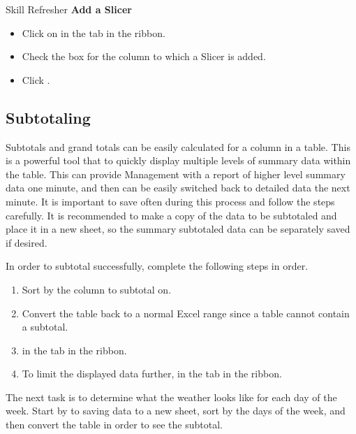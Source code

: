 \begin{center}
	\begin{sklbox}{Skill Refresher}
		\textbf{Add a Slicer}
		\\
		\begin{itemize}
			\setlength{\itemsep}{0pt}
			\setlength{\parskip}{0pt}
			\setlength{\parsep}{0pt}

			\item Click on  in the  tab in the ribbon.
			\item Check the box for the column to which a Slicer is added.
			\item Click .
			
		\end{itemize}
	\end{sklbox}
\end{center}

\subsection{Subtotaling}

Subtotals and grand totals can be easily calculated for a column in a table. This is a powerful tool that to quickly display multiple levels of summary data within the table. This can provide Management with a report of higher level summary data one minute, and then can be easily switched back to detailed data the next minute. It is important to save often during this process and follow the steps carefully. It is recommended to make a copy of the data to be subtotaled and place it in a new sheet, so the summary subtotaled data can be separately saved if desired.

In order to subtotal successfully, complete the following steps in order.

\begin{enumerate}
	\item Sort by the column to subtotal on.
	\item Convert the table back to a normal Excel range since a table cannot contain a subtotal.
	\item {} in the  tab in the ribbon.
	\item To limit the displayed data further,  in the  tab in the ribbon.
\end{enumerate}

The next task is to determine what the weather looks like for each day of the week. Start by to saving data to a new sheet, sort by the days of the week, and then convert the table in order to see the subtotal.

